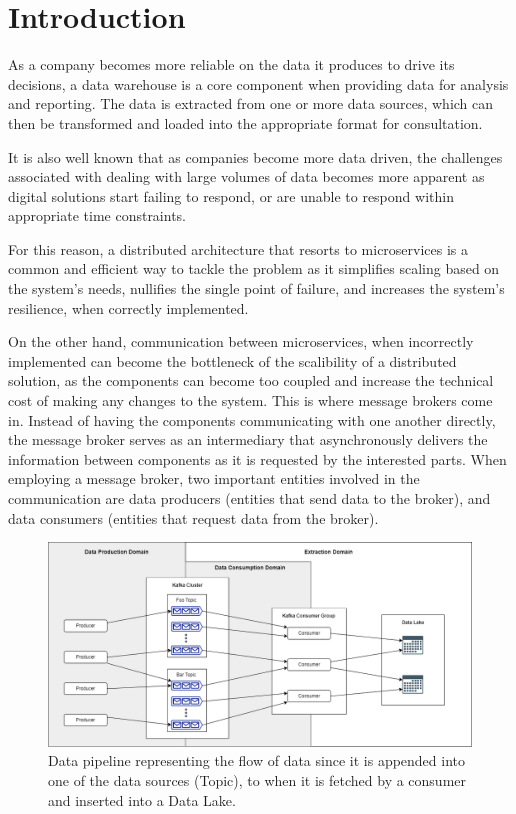 \chapter{Introduction} \label{chap:intro}


As a company becomes more reliable on the data it produces to drive its
decisions, a data warehouse is a core component when providing data for analysis
and reporting. The data is extracted from one or more data sources, which can
then be transformed and loaded into the appropriate format for consultation. 

It is also well known that as companies become more data driven, the challenges
associated with dealing with large volumes of data becomes more apparent as
digital solutions start failing to respond, or are unable to respond within
appropriate time constraints. 

For this reason, a distributed architecture that resorts to microservices is a
common and efficient way to tackle the problem as it simplifies scaling based on
the system's needs, nullifies the single point of failure, and increases the
system's resilience, when correctly implemented. 

On the other hand, communication between microservices, when incorrectly
implemented can become the bottleneck of the scalibility of a distributed
solution, as the components can become too coupled and increase the technical
cost of making any changes to the system. This is where message brokers come in.
Instead of having the components communicating with one another directly, the
message broker serves as an intermediary that asynchronously delivers the
information between components as it is requested by the interested parts. When
employing a message broker, two important entities involved in the communication
are data producers (entities that send data to the broker), and data consumers
(entities that request data from the broker). 

\begin{figure}[htb!]
    \centering
    \includegraphics[width=\textwidth]{images/introduction/Context.png}
\caption{
    Data pipeline representing the flow of data since it is appended into one of
    the data sources (Topic), to when it is fetched by a consumer and inserted
    into a Data Lake.
}
\label{fig:problem_context}
\end{figure}


